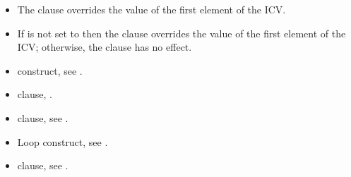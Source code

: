 \linenumbers

\descr
\begin{itemize}
\item The  clause overrides the value of the first element of the
 ICV.

\item If  is not set to  then the  clause overrides the value of the
first element of the  ICV; otherwise, the  clause has no effect.
\end{itemize}

\crossreferences
\begin{itemize}
\item {} construct, see
.

\item {} clause,
.

\item {} clause, see
.

\item Loop construct, see
.

\item {} clause, see
.
\end{itemize}





